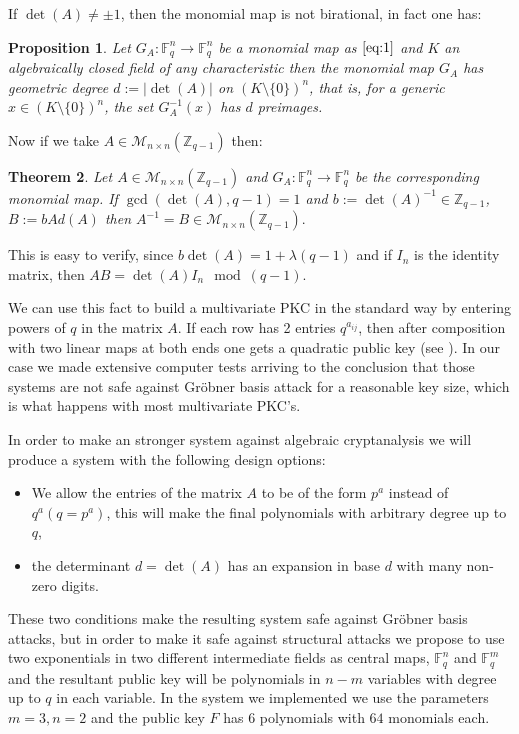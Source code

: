 \documentclass[12pt,a4paper]{amsart}
\newtheorem{thm}{Theorem}
\newtheorem{prop0}[thm]{Proposition}
\theoremstyle{remark}
\theoremstyle{definition}
\newcommand\bz{{\mathbb Z}}
\newcommand\gfq{\mathbb{F}_q}
\begin{document}
If $\det(A)\ne \pm 1$, then the monomial map is not birational, in fact one has:

\begin{prop0}
Let $G_A: \gfq^n \to \gfq^n$  be a monomial map as $\eqref{eq:1}$ and $K$ an algebraically closed field of any characteristic 
then the monomial map $G_A$ has geometric degree $d:=|\det(A)|$ on $(K\setminus \{0\})^n$,
that is, for a generic $x\in (K\setminus \{0\})^n$, the set $G_A^{-1}(x)$ has $d$ preimages.
\end{prop0}

Now if we take $A\in \mathscr{M}_{n\times n}(\bz_{q-1})$ then:

\begin{thm}
Let  $A\in \mathscr{M}_{n\times n}(\bz_{q-1})$ and $G_A: \gfq^n \to \gfq^n$  be the corresponding  monomial map.
If $\gcd(\det(A), q-1)=1$ and $b:=\det(A)^{{-1}} \in  \bz_{q-1}$, $B:=b Ad(A)$ then $A^{-1}=B   \in \mathscr{M}_{n\times n}(\bz_{q-1}).$
\end{thm}
This is easy to verify, since $b \det(A)=1+\lambda (q-1) $ and if $I_n$ is the identity matrix, then $A B=\det(A) I_n \mod (q-1).$

We can use this fact to build a multivariate PKC in the standard way by entering powers of $q$ in the matrix $A$. 
If each row has 2 entries $q^{a_{ij}}$, then after composition with two linear maps at both ends one gets a quadratic 
public key (see \cite{D}). In our case we made extensive computer tests arriving to the conclusion that those systems are 
not safe against Gr\"obner basis attack for a reasonable key size, which is what happens with most multivariate PKC's.

In order to make an stronger system against algebraic cryptanalysis we will produce a system with the following design options:

\begin{itemize}
\item  We allow the entries of the matrix $A$ to be of the form $p^a$ instead of $q^a (q=p^a)$, 
this will make the final polynomials with arbitrary degree up to $q$,

\item the determinant $d=\det(A)$ has an expansion in base $d$  with many non-zero digits.
\end{itemize}

These two conditions make the resulting system safe against Gr\"obner basis attacks, but in order to make it safe 
against structural attacks we propose to use two exponentials in two different intermediate fields as central maps, $\gfq^n$ and $\gfq^m$ 
and the resultant public key will be polynomials in $n-m$ variables with degree up to $q$ in each variable. 
In the system we implemented we use the parameters $m=3, n=2$ and the public key $F$ has $6$ polynomials with $64$ 
monomials each. 
\end{document}
